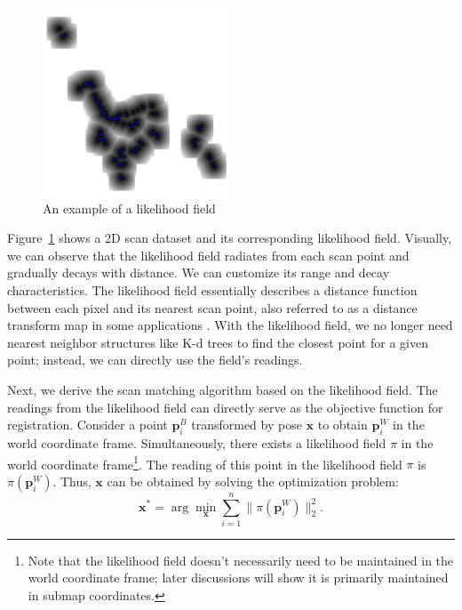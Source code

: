 \begin{figure}[!htp]
	\centering
	\includegraphics[width=0.5\textwidth]{resources/2d-lidar-mapping/likelihood-field}
	\caption{An example of a likelihood field}
	\label{fig:likelihood-field}
\end{figure}

Figure~\ref{fig:likelihood-field} shows a 2D scan dataset and its corresponding likelihood field. Visually, we can observe that the likelihood field radiates from each scan point and gradually decays with distance. We can customize its range and decay characteristics. The likelihood field essentially describes a distance function between each pixel and its nearest scan point, also referred to as a distance transform map in some applications \cite{Felzenszwalb2012}. With the likelihood field, we no longer need nearest neighbor structures like K-d trees to find the closest point for a given point; instead, we can directly use the field's readings.

Next, we derive the scan matching algorithm based on the likelihood field. The readings from the likelihood field can directly serve as the objective function for registration. Consider a point $\bm{p}^B_i$ transformed by pose $\bm{x}$ to obtain $\bm{p}^W_i$ in the world coordinate frame. Simultaneously, there exists a likelihood field $\pi$ in the world coordinate frame\footnote{Note that the likelihood field doesn't necessarily need to be maintained in the world coordinate frame; later discussions will show it is primarily maintained in submap coordinates.}. The reading of this point in the likelihood field $\pi$ is $\pi(\bm{p}^W_i)$. Thus, $\bm{x}$ can be obtained by solving the optimization problem:
\begin{equation}\label{key}
	\bm{x}^* = \arg \min_{\bm{x}} \sum_{i=1}^{n} \| \pi(\bm{p}_i^W) \|_2^2.
\end{equation}

